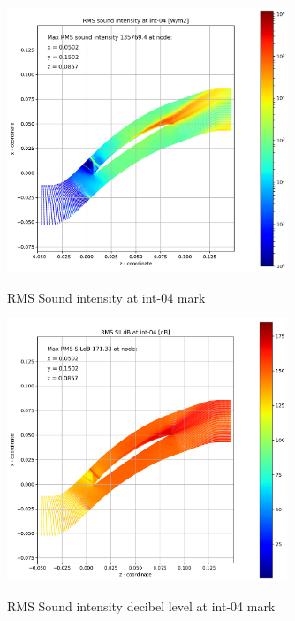 \begin{figure}[ht]
  \centering
  \includegraphics[width=0.75\textwidth]{Figures/int-04-rms-sil.png} \label{int-04-rms-sil}
  \caption{RMS Sound intensity at int-04 mark}
  
  \vspace*{\floatsep}%

  \includegraphics[width=0.75\textwidth]{Figures/int-04-rms-sildb.png} \label{int-04-rms-sildb}
  \caption{RMS Sound intensity decibel level at int-04 mark}
\end{figure}

